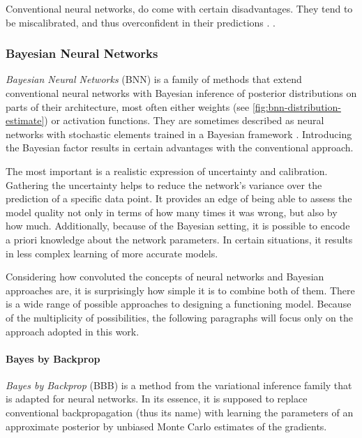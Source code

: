 \vspace{\baselineskip}
Conventional neural networks, do come with certain disadvantages. They tend to be miscalibrated, and thus overconfident in their predictions \cite{Guo2017}.  \cite{Wilson2020}.


\subsubsection{Bayesian Neural Networks}
\textit{Bayesian Neural Networks} (BNN) is a family of methods that extend conventional neural networks with Bayesian inference of posterior distributions on parts of their architecture, most often either weights (see \autoref{fig:bnn-distribution-estimate}) or activation functions. They are sometimes described as neural networks with stochastic elements trained in a Bayesian framework \cite{MacKay1992}. Introducing the Bayesian factor results in certain advantages with the conventional approach.

\vspace{\baselineskip}
The most important is a realistic expression of uncertainty and calibration. Gathering the uncertainty helps to reduce the network's variance over the prediction of a specific data point. It provides an edge of being able to assess the model quality not only in terms of how many times it was wrong, but also by how much. Additionally, because of the Bayesian setting, it is possible to encode a priori knowledge about the network parameters. In certain situations, it results in less complex learning of more accurate models.

\vspace{\baselineskip}
Considering how convoluted the concepts of neural networks and Bayesian approaches are, it is surprisingly how simple it is to combine both of them. There is a wide range of possible approaches to designing a functioning model. Because of the multiplicity of possibilities, the following paragraphs will focus only on the approach adopted in this work.

\paragraph{Bayes by Backprop}\label{paragraph:bayes-by-backrop}
\textit{Bayes by Backprop} (BBB) \cite{Blundell2015} is a method from the variational inference family that is adapted for neural networks. In its essence, it is supposed to replace conventional backpropagation (thus its name) with learning the parameters of an approximate posterior by unbiased Monte Carlo estimates of the gradients.

